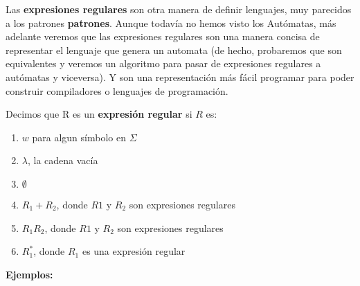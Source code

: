 Las \textbf{expresiones regulares} son otra manera de definir lenguajes, muy parecidos a los patrones \textbf{patrones}. Aunque todavía 
no hemos visto los Autómatas, más adelante veremos que las expresiones regulares son una manera concisa
de representar el lenguaje que genera un automata (de hecho, probaremos que son equivalentes y veremos un 
algoritmo para pasar de expresiones regulares a autómatas y viceversa). Y son una representación más fácil programar para poder 
construir compiladores o lenguajes de programación.  

\begin{Def}
    Decimos que R es un \textbf{expresión regular} si $R$ es:
    \begin{enumerate}
        \item $w$ para algun símbolo en $\Sigma$
        \item $\lambda$, la cadena vacía
        \item $\emptyset$
        \item $R_1 + R_2$, donde $R1$ y $R_2$ son expresiones regulares
        \item $R_1R_2$, donde $R1$ y $R_2$ son expresiones regulares
        \item $R_1^*$, donde $R_1$ es una expresión regular
    \end{enumerate}
\end{Def}

\textbf{Ejemplos:}

